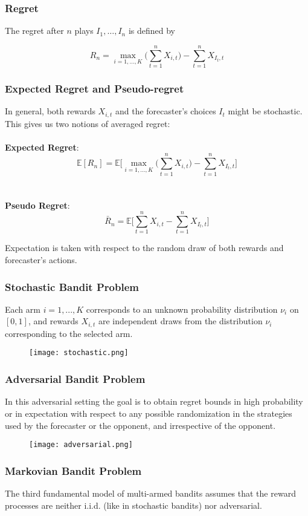 \documentclass{beamer}
\begin{document}
\begin{frame}
\frametitle{Regret}

The regret after $n$ plays $I_1,\dots,I_n$ is defined by

$$R_n = \max_{i=1,\dots,K}\Big(\sum_{t=1}^n X_{i,t}\Big) - \sum_{t=1}^n X_{I_t, t}$$

\end{frame}

\begin{frame}
\frametitle{Expected Regret and Pseudo-regret}
In general, both rewards $X_{i,t}$ and the forecaster's choices $I_t$ might be stochastic. This gives us two notions of averaged regret:\\~\\

\textbf{Expected Regret}:
$$\mathbb{E}[R_n] = \mathbb{E}
\bigg[
\max_{i=1,\dots,K}\Big(\sum_{t=1}^n X_{i,t}\Big)
-
\sum_{t=1}^n X_{I_t, t}
\bigg] $$
\\~\\
\textbf{Pseudo Regret}:
$$\bar{R}_n = 
\mathbb{E}
\bigg[
\sum_{t=1}^n X_{i,t}
-
\sum_{t=1}^n X_{I_t, t}
\bigg]$$

Expectation is taken with respect to the random draw of both rewards and forecaster's actions.
\end{frame}

\begin{frame}
\frametitle{Stochastic Bandit Problem}
Each arm $i = 1, ... , K$ corresponds to an unknown probability distribution $\nu_i$ on $[0, 1]$, and rewards $X_{i,t}$ are independent draws  from the distribution $\nu_i$ corresponding to the selected arm.

\begin{figure}[H]
  \centerline{\texttt{[image: stochastic.png]}}
\end{figure}
\end{frame}

\begin{frame}
\frametitle{Adversarial Bandit Problem}
In this adversarial setting the goal is to obtain regret bounds in high
probability or in expectation with respect to any possible randomization in the strategies used by the forecaster or the opponent, and irrespective of the opponent.
\begin{figure}[H]
\centerline{\texttt{[image: adversarial.png]}}
\end{figure}
\end{frame}

\begin{frame}
\frametitle{Markovian Bandit Problem}
The third fundamental model of multi-armed bandits assumes that
the reward processes are neither i.i.d. (like in stochastic bandits) nor
adversarial. \\~\\


\end{frame}
\end{document}
